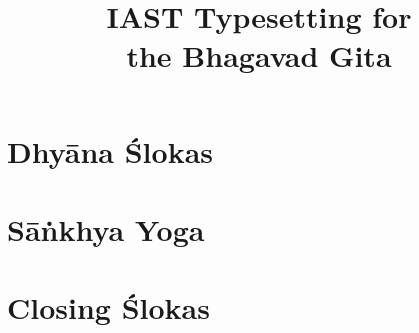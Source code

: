 \documentclass{scrbook}
\title{IAST Typesetting for \\ the Bhagavad Gita}
\author{}
\begin{document}
\maketitle
\frontmatter

\tableofcontents
\newpage

\chapter{Dhyāna Ślokas}


\mainmatter
\setcounter{chapter}{1}

\chapter{Sāṅkhya Yoga}
\begin{multicols}{2} 
    
\end{multicols}

\backmatter
\chapter{Closing Ślokas}

\end{document}
